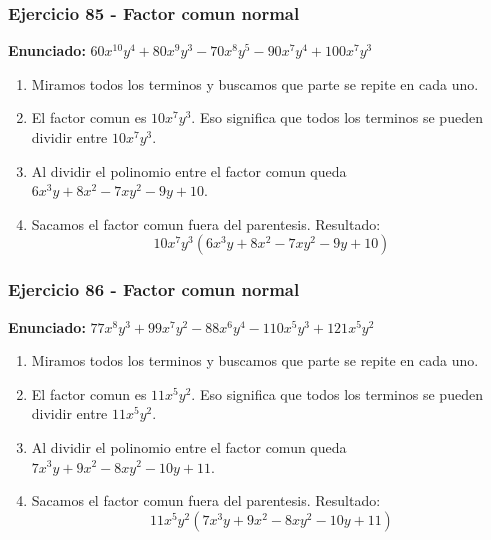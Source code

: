 \documentclass[11pt,a4paper]{article}
\begin{document}
\subsubsection*{Ejercicio 85 - Factor comun normal}
\textbf{Enunciado:} $ 60 x^{10} y^{4} + 80 x^{9} y^{3} - 70 x^{8} y^{5} - 90 x^{7} y^{4} + 100 x^{7} y^{3} $\par
\begin{enumerate}[leftmargin=2em]
\item Miramos todos los terminos y buscamos que parte se repite en cada uno.
\item El factor comun es \(10 x^{7} y^{3}\). Eso significa que todos los terminos se pueden dividir entre \(10 x^{7} y^{3}\).
\item Al dividir el polinomio entre el factor comun queda \(6 x^{3} y + 8 x^{2} - 7 x y^{2} - 9 y + 10\).
\item Sacamos el factor comun fuera del parentesis. Resultado: \[\boxed{10 x^{7} y^{3}\left(6 x^{3} y + 8 x^{2} - 7 x y^{2} - 9 y + 10\right)}\]
\end{enumerate}

\vspace{0.2cm}
\subsubsection*{Ejercicio 86 - Factor comun normal}
\textbf{Enunciado:} $ 77 x^{8} y^{3} + 99 x^{7} y^{2} - 88 x^{6} y^{4} - 110 x^{5} y^{3} + 121 x^{5} y^{2} $\par
\begin{enumerate}[leftmargin=2em]
\item Miramos todos los terminos y buscamos que parte se repite en cada uno.
\item El factor comun es \(11 x^{5} y^{2}\). Eso significa que todos los terminos se pueden dividir entre \(11 x^{5} y^{2}\).
\item Al dividir el polinomio entre el factor comun queda \(7 x^{3} y + 9 x^{2} - 8 x y^{2} - 10 y + 11\).
\item Sacamos el factor comun fuera del parentesis. Resultado: \[\boxed{11 x^{5} y^{2}\left(7 x^{3} y + 9 x^{2} - 8 x y^{2} - 10 y + 11\right)}\]
\end{enumerate}

\vspace{0.2cm}
\end{document}
